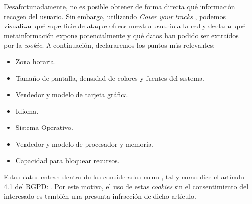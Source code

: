 Desafortunadamente, no es posible obtener de forma directa qué información recogen del usuario. Sin embargo, utilizando \textit{Cover your tracks} \cite{coveryourtracks}, podemos visualizar qué superficie de ataque ofrece nuestro usuario a la red y declarar qué metainformación expone potencialmente y qué datos han podido ser extraídos por la \textit{cookie}. A continuación, declararemos los puntos más relevantes:
\begin{itemize}
    \item Zona horaria.
    \item Tamaño de pantalla, densidad de colores y fuentes del sistema.
    \item Vendedor y modelo de tarjeta gráfica.
    \item Idioma.
    \item Sistema Operativo.
    \item Vendedor y modelo de procesador y memoria.
    \item Capacidad para bloquear recursos.
\end{itemize}

Estos datos entran dentro de los considerados como , tal y como dice el artículo 4.1 del RGPD: . Por este motivo, el uso de estas \textit{cookies} sin el consentimiento del interesado es también una presunta infracción de dicho artículo.